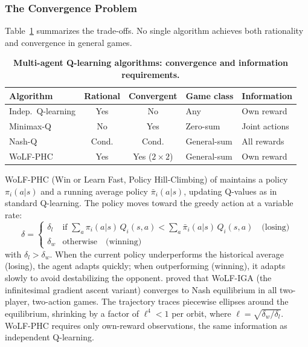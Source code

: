 \subsubsection{The Convergence Problem}

Table~\ref{tab:marl_comparison} summarizes the trade-offs. No single algorithm achieves both rationality and convergence in general games.

\begin{table}[htbp]
\centering
\caption[Multi-agent Q-learning algorithms: convergence and information requirements]{\textbf{Multi-agent Q-learning algorithms: convergence and information requirements.}}
\label{tab:marl_comparison}
\begin{tabular}{l cc ll}
\hline
Algorithm & Rational & Convergent & Game class & Information \\
\hline
Indep.\ Q-learning & Yes & No & Any & Own reward \\
Minimax-Q & No & Yes & Zero-sum & Joint actions \\
Nash-Q & Cond. & Cond. & General-sum & All rewards \\
WoLF-PHC & Yes & Yes ($2{\times}2$) & General-sum & Own reward \\
\hline
\end{tabular}
\end{table}

WoLF-PHC (Win or Learn Fast, Policy Hill-Climbing) of \citet{BowlingVeloso2002} maintains a policy $\pi_i(a|s)$ and a running average policy $\bar{\pi}_i(a|s)$, updating Q-values as in standard Q-learning. The policy moves toward the greedy action at a variable rate:
\begin{equation}
\delta = \begin{cases}
\delta_l & \text{if } \sum_a \pi_i(a|s)\, Q_i(s,a) < \sum_a \bar{\pi}_i(a|s)\, Q_i(s,a) \quad \text{(losing)} \\
\delta_w & \text{otherwise} \quad \text{(winning)}
\end{cases}
\end{equation}
with $\delta_l > \delta_w$. When the current policy underperforms the historical average (losing), the agent adapts quickly; when outperforming (winning), it adapts slowly to avoid destabilizing the opponent. \citet{BowlingVeloso2002} proved that WoLF-IGA (the infinitesimal gradient ascent variant) converges to Nash equilibrium in all two-player, two-action games. The trajectory traces piecewise ellipses around the equilibrium, shrinking by a factor of $\ell^4 < 1$ per orbit, where $\ell = \sqrt{\delta_w / \delta_l}$. WoLF-PHC requires only own-reward observations, the same information as independent Q-learning.

